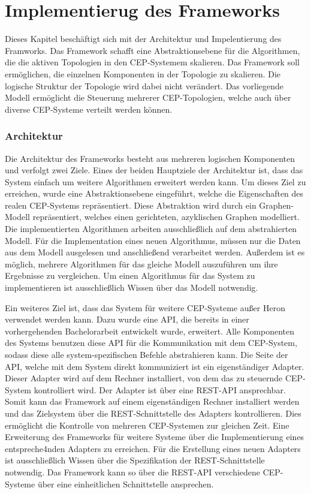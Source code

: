\chapter{Implementierug des Frameworks}

Dieses Kapitel beschäftigt sich mit der Architektur und Impelentierung des Framworks.
Das Framework schafft eine Abstraktionsebene für die Algorithmen, die die aktiven Topologien in den CEP-Systemem skalieren.
Das Framework soll ermöglichen, die einzelnen Komponenten in der Topologie zu skalieren. Die logische Struktur der Topologie wird dabei nicht verändert. Das vorliegende Modell ermöglicht die Steuerung mehrerer CEP-Topologien, welche auch über diverse CEP-Systeme verteilt werden können. 

\subsection{Architektur}

Die Architektur des Frameworks besteht aus mehreren logischen Komponenten und verfolgt zwei Ziele.
Eines der beiden Hauptziele der Architektur ist, dass das System einfach um weitere Algorithmen erweitert werden kann.
Um dieses Ziel zu erreichen, wurde eine Abstraktionsebene eingeführt, welche die Eigenschaften des realen CEP-Systems repräsentiert.
Diese Abstraktion wird durch ein Graphen-Modell repräsentiert, welches einen gerichteten, azyklischen Graphen modelliert.
Die implementierten Algorithmen arbeiten ausschließlich auf dem abstrahierten Modell.
Für die Implementation eines neuen Algorithmus, müssen nur die Daten aus dem Modell ausgelesen und anschließend verarbeitet werden.
Außerdem ist es möglich, mehrere Algorithmen für das gleiche Modell auszuführen um ihre Ergebnisse zu vergleichen.
Um einen Algorithmus für das System zu implementieren ist ausschließlich Wissen über das Modell notwendig.

Ein weiteres Ziel ist, dass das System für weitere CEP-Systeme außer Heron verwendet werden kann.
Dazu wurde eine API, die bereits in einer vorhergehenden Bachelorarbeit entwickelt wurde, erweitert.
Alle Komponenten des Systems benutzen diese API für die Kommunikation mit dem CEP-System, sodass diese alle system-spezifischen Befehle abstrahieren kann.
Die Seite der API, welche mit dem System direkt kommuniziert ist ein eigenständiger Adapter.
Dieser Adapter wird auf dem Rechner installiert, von dem das zu steuernde CEP-System kontrolliert wird.
Der Adapter ist über eine REST-API ansprechbar.
Somit kann das Framework auf einem eigenständigen Rechner installiert werden und das Zielsystem über die REST-Schnittstelle des Adapters kontrollieren.
Dies ermöglicht die Kontrolle von mehreren CEP-Systemen zur gleichen Zeit.
Eine Erweiterung des Frameworks für weitere Systeme über die Implementierung eines entspreche4nden Adapters zu erreichen.
Für die Erstellung eines neuen Adapters ist ausschließlich Wissen über die Spezifikation der REST-Schnittstelle notwendig.
Das Framework kann so über die REST-API verschiedene CEP-Systeme über eine einheitlichen Schnittstelle ansprechen.

